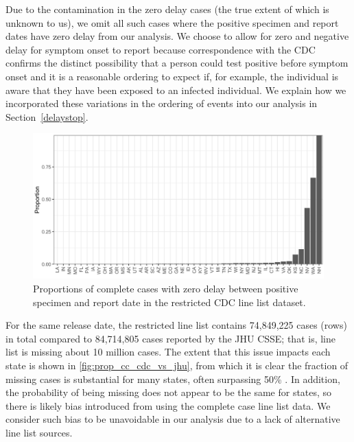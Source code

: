 \documentclass{article}
\begin{document}
Due to the contamination in the zero delay cases (the true extent of
which is unknown to us), we omit all such cases where the positive specimen and report dates have zero delay from our analysis.
We choose to allow for zero and negative delay for symptom onset to report because 
correspondence with the CDC confirms the distinct possibility that a person could 
test positive before symptom onset and it is a reasonable ordering to expect if, for example, the individual is aware
that they have been exposed to an infected individual. 
We explain how we incorporated these variations in the ordering of events into our analysis in Section~\ref{delaystop}. 

\begin{figure}[!tb]
\centering
    \includegraphics[width=.99\textwidth]{prop_cc_zero_delay.pdf}
    \caption{Proportions of complete cases with zero delay between positive specimen and report date in the 
    restricted CDC line list dataset.}
    \label{fig:prop_cc_zero_delay}
\end{figure}

For the same release date, the restricted line list contains 74,849,225 cases
(rows) in total compared to 84,714,805 cases reported by the JHU CSSE; that is,
line list is missing about 10 million cases. The
extent that this issue impacts each state is shown in
\autoref{fig:prop_cc_cdc_vs_jhu}, from which it is clear the fraction of missing
cases is substantial for many states, often surpassing 50\%
\citep{jahja2022real}. In addition, the probability of being missing does not
appear to be the same for states, so there is likely bias introduced from using
the complete case line list data. We consider such bias to be unavoidable in our
analysis due to a lack of alternative line list sources.
\end{document}
